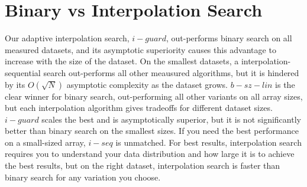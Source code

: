 \documentclass[twocolumn]{article}
\begin{document}
\begin{figure}[t]
\end{figure} \label{predict}

\begin{figure}[t]
\end{figure} \label{l1}

\section{Binary vs Interpolation Search}

Our adaptive interpolation search, $i-guard$, out-performs binary search on all measured datasets, and its asymptotic superiority causes this advantage to increase with the size of the dataset. On the smallest datasets, a interpolation-sequential search out-performs all other meausured algorithms, but it is hindered by its $O(\sqrt N)$ asymptotic complexity as the dataset grows. $b-sz-lin$ is the clear winner for binary search, out-performing all other variants on all array sizes, but each interpolation algorithm gives tradeoffs for different dataset sizes. $i-guard$ scales the best and is asymptotically superior, but it is not significantly better than binary search on the smallest sizes. If you need the best performance on a small-sized array, $i-seq$ is unmatched. For best results, interpolation search requires you to understand your data distribution and how large it is to achieve the best results, but on the right dataset, interpolation search is faster than binary search for any variation you choose.

\begin{figure}[t]
\end{figure} \label{sizes}
\end{document}
